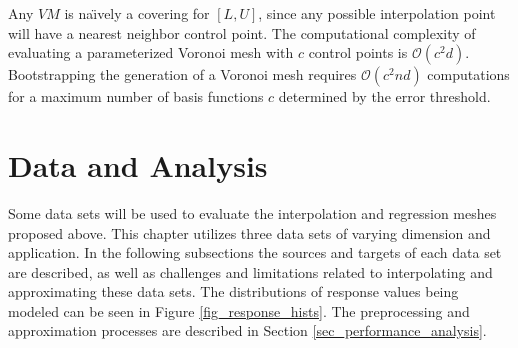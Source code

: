 Any $VM$ is na\"{\i}vely a covering for $[L,U]$, since any possible interpolation point will have a nearest neighbor control point. The computational complexity of evaluating a parameterized Voronoi mesh with $c$ control points is $\mathcal{O}(c^2 d)$. Bootstrapping the generation of a Voronoi mesh requires $\mathcal{O}(c^2 n d)$ computations for a maximum number of basis functions $c$ determined by the error threshold.






\section{Data and Analysis}

Some data sets will be used to evaluate the interpolation and regression meshes proposed above. This chapter utilizes three data sets of varying dimension and application. In the following subsections the sources and targets of each data set are described, as well as challenges and limitations related to interpolating and approximating these data sets. The distributions of response values being modeled can be seen in Figure \ref{fig_response_hists}. The preprocessing and approximation processes are described in Section \ref{sec_performance_analysis}.

